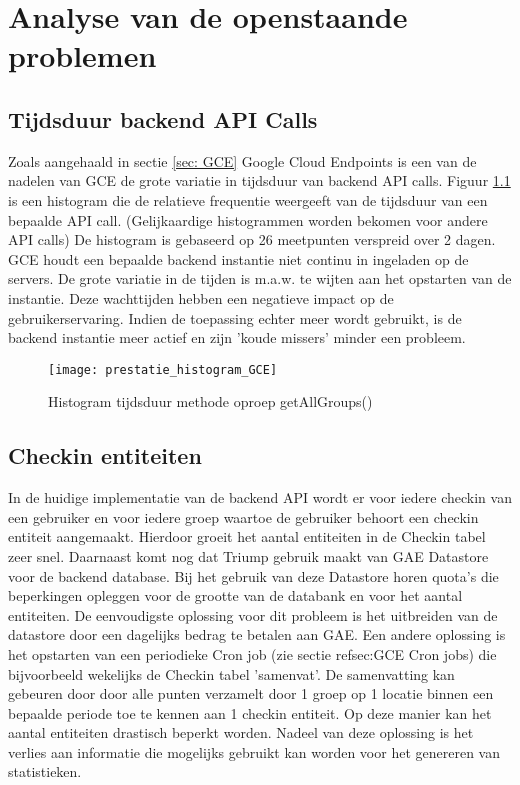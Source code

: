 
\chapter{Analyse van de openstaande problemen}%

\section{Tijdsduur backend API Calls}
\label{tijdsduur}
Zoals aangehaald in sectie \ref{sec: GCE} Google Cloud Endpoints is een van de nadelen van GCE de grote variatie in tijdsduur van backend API calls. Figuur \ref{fig:hist_getAllGroups} is een histogram die de relatieve frequentie weergeeft van de tijdsduur van een bepaalde API call. (Gelijkaardige histogrammen worden bekomen voor andere API calls) De histogram is gebaseerd op 26 meetpunten verspreid over 2 dagen. GCE houdt een bepaalde backend instantie niet continu in ingeladen op de servers. De grote variatie in de tijden is m.a.w. te wijten aan het opstarten van de instantie. Deze wachttijden hebben een negatieve impact op de gebruikerservaring. Indien de toepassing echter meer wordt gebruikt, is de backend instantie meer actief en zijn 'koude missers' minder een probleem.
\begin{figure}[H]
	\centering
	\texttt{[image: prestatie\_histogram\_GCE]}
	\caption{Histogram tijdsduur methode oproep getAllGroups()}
	\label{fig:hist_getAllGroups}
\end{figure}


\section{Checkin entiteiten}

In de huidige implementatie van de backend API wordt er voor iedere checkin van een gebruiker en voor iedere groep waartoe de gebruiker behoort een checkin entiteit aangemaakt. Hierdoor groeit het aantal entiteiten in de Checkin tabel zeer snel. Daarnaast komt nog dat Triump gebruik maakt van GAE Datastore voor de backend database. Bij het gebruik van deze Datastore horen quota's die beperkingen opleggen voor de grootte van de databank en voor het aantal entiteiten. 
De eenvoudigste oplossing voor dit probleem is het uitbreiden van de datastore door een dagelijks bedrag te betalen aan GAE. Een andere oplossing is het opstarten van een periodieke Cron job (zie sectie ref{sec:GCE} Cron jobs) die bijvoorbeeld wekelijks de Checkin tabel 'samenvat'. De samenvatting kan gebeuren door door alle punten verzamelt door 1 groep op 1 locatie binnen een bepaalde periode toe te kennen aan 1 checkin entiteit. Op deze manier kan het aantal entiteiten drastisch beperkt worden. Nadeel van deze oplossing is het verlies aan informatie die mogelijks gebruikt kan worden voor het genereren van statistieken. 

